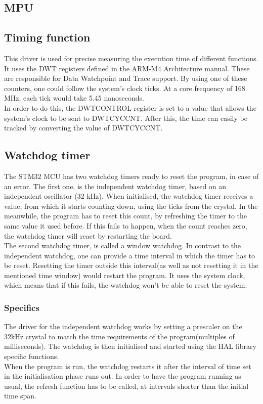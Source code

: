 \subsection{MPU}

\subsection{Timing function}
This driver is used for precise measuring the execution time of different functions. It uses the DWT
 registers defined in the ARM-M4 Architecture manual. These are responsible for Data Watchpoint 
 and Trace support. By using one of these counters, one could follow the system's clock ticks. 
 At a core frequency of 168 MHz, each tick would take 5.45 nanoseconds.\\
In order to do this, the DWT\textunderscore CONTROL register is set to a value that allows the system's clock to be sent to DWT\textunderscore CYCCNT. After this, the time can easily be tracked by converting the value of DWT\textunderscore CYCCNT.

\subsection{Watchdog timer}
The STM32 MCU has two watchdog timers ready to reset the program, in case of an error.
The first one, is the independent watchdog timer, based on an independent oscillator (32 kHz).
When initialised, the watchdog timer receives a value, from which it starts counting down, using
the ticks from the crystal. In the meanwhile, the program has to reset this count, by refreshing 
the timer to the same value it used before. If this fails to happen, when the count reaches zero, 
the watchdog timer will react by restarting the board.
\\
The second watchdog timer, is called a window watchdog. In contrast to the independent watchdog, 
one can provide a time interval in which the timer has to be reset. Resetting the timer outside this interval(as well as not resetting it in the mentioned time window) would restart the program. It uses 
the system clock, which means that if this fails, the watchdog won't be able to reset the system.

\subsubsection{Specifics}
The driver for the independent watchdog works by setting a prescaler on the 32kHz crystal to match 
the time requirements of the program(multiples of milliseconds). The watchdog is then initialised 
and started using the HAL library specific functions. \\
When the program is run, the watchdog restarts it after the interval of time set in the initialisation
phase runs out. In order to have the program running as usual, the refresh function has to be called,
 at intervals shorter than the initial time span.

